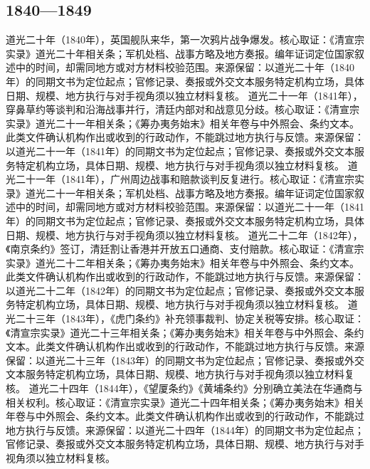 \subsection{1840—1849}
道光二十年（1840年），英国舰队来华，第一次鸦片战争爆发。核心取证：《清宣宗实录》道光二十年相关条；军机处档、战事方略及地方奏报。编年证词定位国家叙述中的时间，却需同地方或对方材料校验范围。来源保留：以道光二十年（1840年）的同期文书为定位起点；官修记录、奏报或外交文本服务特定机构立场，具体日期、规模、地方执行与对手视角须以独立材料复核。
道光二十一年（1841年），穿鼻草约等谈判和沿海战事并行，清廷内部对和战意见分歧。核心取证：《清宣宗实录》道光二十一年相关条；《筹办夷务始末》相关年卷与中外照会、条约文本。此类文件确认机构作出或收到的行政动作，不能跳过地方执行与反馈。来源保留：以道光二十一年（1841年）的同期文书为定位起点；官修记录、奏报或外交文本服务特定机构立场，具体日期、规模、地方执行与对手视角须以独立材料复核。
道光二十一年（1841年），广州周边战事和赔款谈判反复进行。核心取证：《清宣宗实录》道光二十一年相关条；军机处档、战事方略及地方奏报。编年证词定位国家叙述中的时间，却需同地方或对方材料校验范围。来源保留：以道光二十一年（1841年）的同期文书为定位起点；官修记录、奏报或外交文本服务特定机构立场，具体日期、规模、地方执行与对手视角须以独立材料复核。
道光二十二年（1842年），《南京条约》签订，清廷割让香港并开放五口通商、支付赔款。核心取证：《清宣宗实录》道光二十二年相关条；《筹办夷务始末》相关年卷与中外照会、条约文本。此类文件确认机构作出或收到的行政动作，不能跳过地方执行与反馈。来源保留：以道光二十二年（1842年）的同期文书为定位起点；官修记录、奏报或外交文本服务特定机构立场，具体日期、规模、地方执行与对手视角须以独立材料复核。
道光二十三年（1843年），《虎门条约》补充领事裁判、协定关税等安排。核心取证：《清宣宗实录》道光二十三年相关条；《筹办夷务始末》相关年卷与中外照会、条约文本。此类文件确认机构作出或收到的行政动作，不能跳过地方执行与反馈。来源保留：以道光二十三年（1843年）的同期文书为定位起点；官修记录、奏报或外交文本服务特定机构立场，具体日期、规模、地方执行与对手视角须以独立材料复核。
道光二十四年（1844年），《望厦条约》《黄埔条约》分别确立美法在华通商与相关权利。核心取证：《清宣宗实录》道光二十四年相关条；《筹办夷务始末》相关年卷与中外照会、条约文本。此类文件确认机构作出或收到的行政动作，不能跳过地方执行与反馈。来源保留：以道光二十四年（1844年）的同期文书为定位起点；官修记录、奏报或外交文本服务特定机构立场，具体日期、规模、地方执行与对手视角须以独立材料复核。
